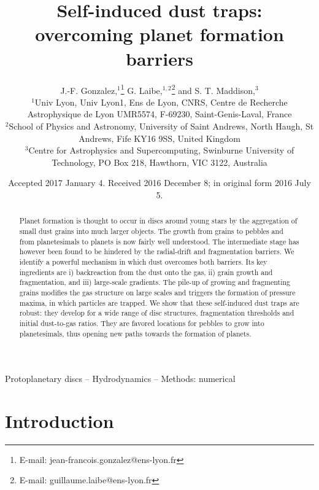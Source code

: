 \documentclass[a4paper,fleqn,usenatbib]{mnras}
\title{Self-induced dust traps: overcoming planet formation barriers}
\author[J.-F. Gonzalez et al.]{
J.-F. Gonzalez,$^{1}$\thanks{E-mail: jean-francois.gonzalez@ens-lyon.fr}
G. Laibe,$^{1,2}$\thanks{E-mail: guillaume.laibe@ens-lyon.fr}
and S. T. Maddison,$^{3}$
\\
$^{1}$Univ Lyon, Univ Lyon1, Ens de Lyon, CNRS, Centre de Recherche Astrophysique de Lyon UMR5574, F-69230, Saint-Genis-Laval, France\\
$^{2}$School of Physics and Astronomy, University of Saint Andrews,
North Haugh, St Andrews, Fife KY16 9SS, United Kingdom\\
$^{3}$Centre for Astrophysics and Supercomputing, Swinburne University of Technology, PO Box 218, Hawthorn, VIC 3122, Australia
}
\date{Accepted 2017 January 4. Received 2016 December 8; in original form 2016 July 5.}
\begin{document}
\label{firstpage}
\pagerange{\pageref{firstpage}--\pageref{lastpage}}
\maketitle

\begin{abstract}
Planet formation is thought to occur in discs around young stars by the aggregation of small dust grains into much larger objects. The growth from grains to pebbles and from planetesimals to planets is now fairly well understood. The intermediate stage has however been found to be hindered by the radial-drift and fragmentation barriers. We identify a powerful mechanism in which dust overcomes both barriers. Its key ingredients are i) backreaction from the dust onto the gas, ii) grain growth and fragmentation, and iii) large-scale gradients. The pile-up of growing and fragmenting grains modifies the gas structure on large scales and triggers the formation of pressure maxima, in which particles are trapped. We show that these self-induced dust traps are robust: they develop for a wide range of disc structures, fragmentation thresholds and initial dust-to-gas ratios. They are favored locations for pebbles to grow into planetesimals, thus opening new paths towards the formation of planets.
\end{abstract}

\begin{keywords}
Protoplanetary discs -- Hydrodynamics -- Methods: numerical
\end{keywords}



\section{Introduction}
\label{sec:Introduction}
\end{document}
